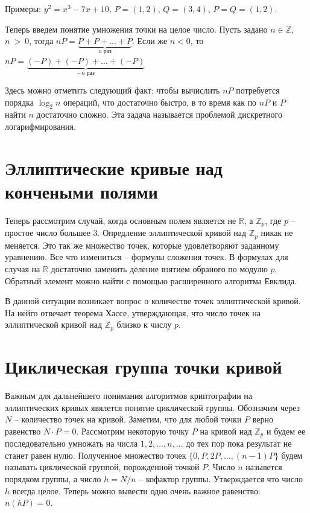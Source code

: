 \documentclass[a4paper,12pt]{article}
\begin{document}
        Примеры: $y^2 = x^3 - 7x + 10$, $P = (1, 2)$, $Q = (3, 4)$, $P = Q = (1, 2)$.

        Теперь введем понятие умножения точки на целое число. Пусть задано $n \in \mathbb{Z}$, $n~>~0$, тогда $nP = \underbrace{P + P + \dots + P}_{n\;\text{раз}}$. 
        Если же $n < 0$, то $nP = \underbrace{(-P) + (-P) + \dots + (-P)}_{-n \; \text{раз}}$

        Здесь можно отметить следующий факт: чтобы вычислить $nP$ потребуется порядка $\log_2{n}$ операций, что достаточно быстро, в
        то время как по $nP$ и $P$ найти $n$ достаточно сложно. Эта задача называется проблемой дискретного логарифмирования.

    \section{Эллиптические кривые над кончеными полями}
        Теперь рассмотрим случай, когда основным полем является не $\mathbb{R}$, а $\mathbb{Z}_p$, где $p$ -- простое 
        число большее 3. Опредление эллиптической кривой над $\mathbb{Z}_p$ никак не меняется. Это так же множество точек, которые удовлетворяют
        заданному уравнению. Все что измениться -- формулы сложения точек. В формулах для случая на $\mathbb{R}$ достаточно заменить деление взятием обраного по
        модулю $p$. Обратный элемент можно найти с помощью расширенного алгоритма Евклида. 
        
        В данной ситуации возникает вопрос о количестве точек эллиптической кривой. На нейго отвечает теорема Хассе, утверждающая, что число точек на эллиптической кривой над 
        $\mathbb{Z}_p$ близко к числу $p$.

    \section{Циклическая группа точки кривой}
        Важным для дальнейшего понимания алгоритмов криптографии на эллиптических кривых явялется понятие циклической группы. Обозначим через $N$ -- количество точек на кривой.
        Заметим, что для любой точки $P$ верно равенство $N \cdot P = 0$.
        Рассмотрим некоторую точку $P$ на кривой над $\mathbb{Z}_p$ и будем ее 
        последовательно умножать на числа $1, 2, \dots, n, \dots$ до тех пор пока результат не станет равен нулю. 
        Полученное множество точек $\{0, P, 2P, \dots, (n-1)P\}$ будем называть  циклической группой, порожденной точкой $P$. 
        Число $n$ назывется порядком группы, а число $h = N / n$ -- кофактор группы. Утверждается что число $h$ всегда целое. Теперь можно
        вывести одно очень важное равенство: $n(hP) = 0$. 
\end{document}
